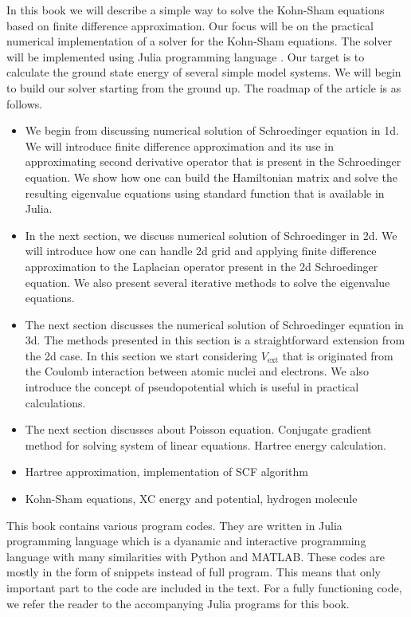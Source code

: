 In this book we will describe a simple way to solve the Kohn-Sham equations based on
finite difference approximation.
Our focus will be on the practical numerical implementation
of a solver for the Kohn-Sham equations.
The solver will be implemented using Julia programming language \cite{juliaorg}.
Our target is to calculate the ground state energy
of several simple model systems. We will begin to build our solver starting from the ground up.
The roadmap of the article is as follows.
\begin{itemize}
\item We begin from discussing numerical solution of Schroedinger equation in 1d.
  We will introduce finite difference approximation and its use in
  approximating second derivative operator that is present in the Schroedinger equation.
  We show how one can build the Hamiltonian matrix and
  solve the resulting eigenvalue equations using standard function that is available in Julia.
\item In the next section, we discuss numerical solution of Schroedinger in 2d. We will introduce
  how one can handle 2d grid and applying finite difference approximation to the Laplacian
  operator present in the 2d Schroedinger equation. We also present several iterative methods
  to solve the eigenvalue equations.
\item The next section discusses the numerical solution of Schroedinger equation in 3d. The methods
  presented in this section is a straightforward extension from the 2d case.
  In this section we start considering $V_{\mathrm{ext}}$ that is originated from the
  Coulomb interaction between atomic nuclei and electrons. We also introduce the concept of
  pseudopotential which is useful in practical calculations.
\item The next section discusses about Poisson equation. Conjugate gradient method for
  solving system of linear equations. Hartree energy calculation.
\item Hartree approximation, implementation of SCF algorithm
\item Kohn-Sham equations, XC energy and potential, hydrogen molecule
\end{itemize}

This book contains various program codes. They are written in Julia programming language
which is a dyanamic and interactive programming language with many similarities with
Python and MATLAB.
These codes are mostly in the form of snippets instead of full program. This means that
only important part to the code are included in the text. For a fully functioning code,
we refer the reader to the accompanying Julia programs for this book.